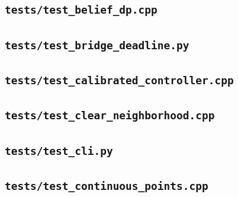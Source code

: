 \subsection*{\texttt{tests/test\_belief\_dp.cpp}}

\subsection*{\texttt{tests/test\_bridge\_deadline.py}}

\subsection*{\texttt{tests/test\_calibrated\_controller.cpp}}

\subsection*{\texttt{tests/test\_clear\_neighborhood.cpp}}

\subsection*{\texttt{tests/test\_cli.py}}

\subsection*{\texttt{tests/test\_continuous\_points.cpp}}

